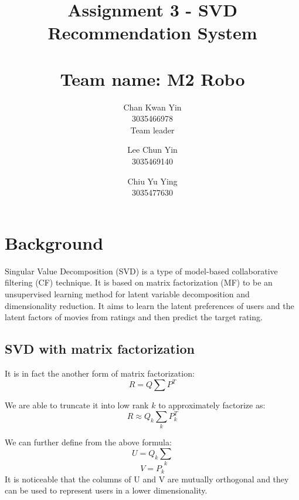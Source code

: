 \documentclass[final]{cvpr}
\begin{document}
\title{
	Assignment 3 - SVD Recommendation System \\~\\
	\large{Team name: M2 Robo}
}

\author{
	Chan Kwan Yin\\
	3035466978 \\
	Team leader

	\and

	Lee Chun Yin\\
	3035469140\\

	\and

	Chiu Yu Ying\\
	3035477630
}

\maketitle

\clearpage

\section{Background}

Singular Value Decomposition (SVD) is a type of model-based collaborative filtering (CF) technique. It is based on matrix factorization (MF) to be an unsupervised learning method for latent variable decomposition and dimensionality reduction.
It aims to learn the latent preferences of users and the latent factors of movies from ratings and then predict the target rating. 

\subsection{SVD with matrix factorization}

It is in fact the another form of matrix factorization:
$$R = Q \sum P^{T}$$

We are able to truncate it into low rank $k$ to approximately factorize as:
$$R \approx Q_k \sum_k P_k^T$$

We can further define from the above formula:
$$U = Q_k \sum_k$$
$$V = P_k$$
It is noticeable that the columns of U and V are mutually orthogonal and they can be used to represent users in a lower dimensionality.
\end{document}

